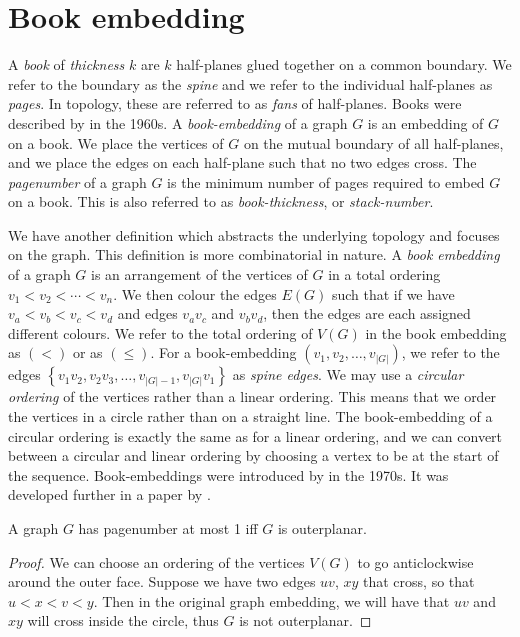 \section{Book embedding}\label{sec:Book Embedding}
A \textit{book} of \textit{thickness} \(k\) are \(k\) half-planes glued together on a common boundary. We refer to the boundary as the \textit{spine} and we refer to the individual half-planes as \textit{pages}. In topology, these are referred to as \textit{fans} of half-planes. Books were described by \textcite{persingerSubsetsNbooksE31966,atneosenOnedimensionalNleavedContinua1972} in the 1960s.
A \textit{book-embedding} of a graph \(G\) is an embedding of \(G\) on a book. We place the vertices of \(G\) on the mutual boundary of all half-planes, and we place the edges on each half-plane such that no two edges cross.
The \textit{pagenumber} of a graph \(G\) is the minimum number of pages required to embed \(G\) on a book. This is also referred to as \textit{book-thickness}, or \textit{stack-number}.
\par
We have another definition which abstracts the underlying topology and focuses on the graph. This definition is more combinatorial in nature.
A \textit{book embedding} of a graph \(G\) is an arrangement of the vertices of \(G\) in a total ordering \(v_1 < v_2 < \cdots < v_n\). We then colour the edges \(E(G)\) such that if we have \(v_a < v_b < v_c < v_d\) and edges \(v_a v_c\) and \(v_b v_d\), then the edges are each assigned different colours.
We refer to the total ordering of \(V(G)\) in the book embedding as \((<)\) or as \((\leq)\). For a book-embedding \((v_1, v_2, \ldots, v_{|G|})\), we refer to the edges \( \left\{ v_1 v_2, v_2 v_3, \ldots, v_{|G| - 1}, v_{|G|}v_{1} \right\} \) as \textit{spine edges}.
We may use a \textit{circular ordering} of the vertices rather than a linear ordering. This means that we order the vertices in a circle rather than on a straight line. The book-embedding of a circular ordering is exactly the same as for a linear ordering, and we can convert between a circular and linear ordering by choosing a vertex to be at the start of the sequence.
Book-embeddings were introduced by \textcite{kainenRecentResultsTopological1974, ollmannBookThicknessVarious1973} in the 1970s. It was developed further in a paper by \textcite{bernhartBookThicknessGraph1979}.
\begin{lemma}\label{lem:Pagenumber_1}
	A graph \(G\) has pagenumber at most 1 iff \(G\) is outerplanar.
\end{lemma}
\begin{proof}
	We can choose an ordering of the vertices \(V(G)\) to go anticlockwise around the outer face. Suppose we have two edges \(uv\), \(xy\) that cross, so that \(u < x < v < y\). Then in the original graph embedding, we will have that \(uv\) and \(xy\) will cross inside the circle, thus \(G\) is not outerplanar.
\end{proof}
